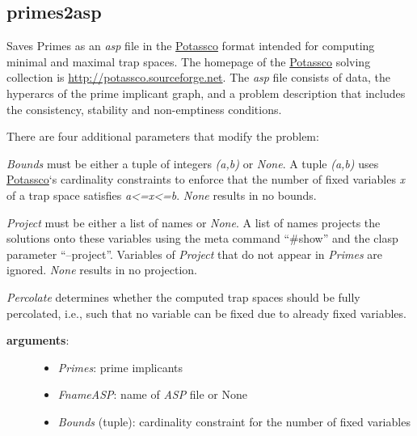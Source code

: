 \documentclass[letterpaper,10pt,english]{sphinxmanual}
\begin{document}
\subsection{primes2asp}
\label{TrapSpaces:id6}\label{TrapSpaces:primes2asp}

\begin{fulllineitems}
\label{TrapSpaces:PyBoolNet.TrapSpaces.primes2asp}
Saves Primes as an \emph{asp} file in the \href{http://potassco.sourceforge.net/}{Potassco} format intended for computing minimal and maximal trap spaces.
The homepage of the \href{http://potassco.sourceforge.net/}{Potassco} solving collection is \href{http://potassco.sourceforge.net}{http://potassco.sourceforge.net}.
The \emph{asp} file consists of data, the hyperarcs of the prime implicant graph,
and a problem description that includes the consistency, stability and non-emptiness conditions.

There are four additional parameters that modify the problem:

\emph{Bounds} must be either a tuple of integers \emph{(a,b)} or \emph{None}.
A tuple \emph{(a,b)} uses \href{http://potassco.sourceforge.net/}{Potassco}`s cardinality constraints to enforce that the number of fixed variables \emph{x} of a trap space satisfies \emph{a\textless{}=x\textless{}=b}.
\emph{None} results in no bounds.

\emph{Project} must be either a list of names or \emph{None}.
A list of names projects the solutions onto these variables using the meta command ``\#show'' and the clasp parameter ``--project''.
Variables of \emph{Project} that do not appear in \emph{Primes} are ignored.
\emph{None} results in no projection.

\emph{Percolate} determines whether the computed trap spaces should be fully percolated, i.e., such that no variable can be fixed due to already
fixed variables.
\begin{description}
\item[{\textbf{arguments}:}] \leavevmode\begin{itemize}
\item {} 
\emph{Primes}: prime implicants

\item {} 
\emph{FnameASP}: name of \emph{ASP} file or None

\item {} 
\emph{Bounds} (tuple): cardinality constraint for the number of fixed variables


\end{itemize}
\end{description}
\end{fulllineitems}
\end{document}
